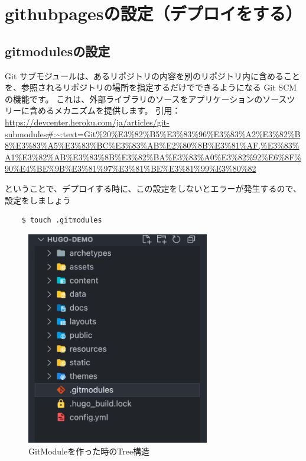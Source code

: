 \chapter{githubpagesの設定（デプロイをする）}
\section{gitmodulesの設定}

  \begin{tcolorbox}[title=gitmodulesとは]
    Git サブモジュール​は、あるリポジトリの内容を別のリポジトリ内に含めることを、参照されるリポジトリの場所を指定するだけでできるようになる Git SCM​ の機能です。 これは、外部ライブラリのソースをアプリケーションのソースツリーに含めるメカニズムを提供します。
    引用：\url{https://devcenter.heroku.com/ja/articles/git-submodules#:~:text=Git%20%E3%82%B5%E3%83%96%E3%83%A2%E3%82%B8%E3%83%A5%E3%83%BC%E3%83%AB%E2%80%8B%E3%81%AF,%E3%83%A1%E3%82%AB%E3%83%8B%E3%82%BA%E3%83%A0%E3%82%92%E6%8F%90%E4%BE%9B%E3%81%97%E3%81%BE%E3%81%99%E3%80%82}

  \end{tcolorbox}

  ということで、デプロイする時に、この設定をしないとエラーが発生するので、設定をしましょう

  \begin{shaded}
    \begin{verbatim}
    $ touch .gitmodules
    \end{verbatim}
  \end{shaded}

  \begin{figure}[H]
    \centering
    \includegraphics[width=8cm]{./image/02-chap6/make-modules-tree.png}
    \caption{GitModuleを作った時のTree構造}
    \label{chap6-make-modules-tree-image}
  \end{figure}

